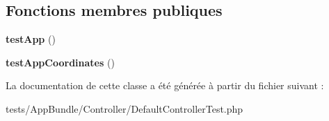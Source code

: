 \subsection*{Fonctions membres publiques}
\begin{DoxyCompactItemize}
\item 
\mbox{\label{classTests_1_1AppBundle_1_1Controller_1_1DefaultControllerTest_af5162a9f3808a733b782c281bf3d5bb5}} 
{\bfseries test\+App} ()
\item 
\mbox{\label{classTests_1_1AppBundle_1_1Controller_1_1DefaultControllerTest_ac9ef62ffe6807485a78118db1d60bb11}} 
{\bfseries test\+App\+Coordinates} ()
\end{DoxyCompactItemize}


La documentation de cette classe a été générée à partir du fichier suivant \+:\begin{DoxyCompactItemize}
\item 
tests/\+App\+Bundle/\+Controller/Default\+Controller\+Test.\+php\end{DoxyCompactItemize}
